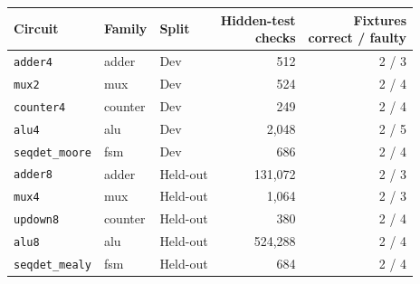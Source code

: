 \begin{tabular}{l l l r r}
\toprule
Circuit & Family & Split & \makecell{Hidden-test\\checks} & \makecell{Fixtures\\correct / faulty} \\
\midrule
\texttt{adder4} & adder & Dev & 512 & 2 / 3 \\
\texttt{mux2} & mux & Dev & 524 & 2 / 4 \\
\texttt{counter4} & counter & Dev & 249 & 2 / 4 \\
\texttt{alu4} & alu & Dev & 2,048 & 2 / 5 \\
\texttt{seqdet\_moore} & fsm & Dev & 686 & 2 / 4 \\
\texttt{adder8} & adder & Held-out & 131,072 & 2 / 3 \\
\texttt{mux4} & mux & Held-out & 1,064 & 2 / 3 \\
\texttt{updown8} & counter & Held-out & 380 & 2 / 4 \\
\texttt{alu8} & alu & Held-out & 524,288 & 2 / 4 \\
\texttt{seqdet\_mealy} & fsm & Held-out & 684 & 2 / 4 \\
\bottomrule
\end{tabular}
